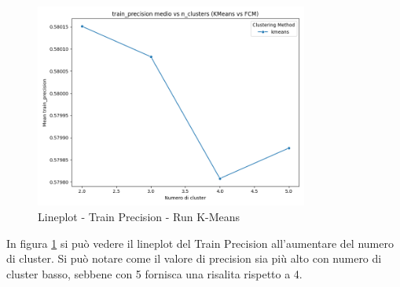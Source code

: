 \begin{figure}[H]
  \centering
  \includegraphics[width=0.8\textwidth]{../output/run_kmeans/images/train/precision/lineplot_nclusters_train_precision.png}
  \caption{Lineplot - Train Precision - Run K-Means}
  \label{fig:train_precision_kmeans}
\end{figure}

In figura \ref{fig:train_precision_kmeans} si può vedere il lineplot del Train Precision all'aumentare del numero di cluster. Si può notare come il valore di precision sia più alto con numero di cluster basso, sebbene con 5 fornisca una risalita rispetto a 4. 

\begin{table}[H]
  \centering
  \caption{Top 5 Configurazioni per Train Recall - Run K-Means}
\end{table}

